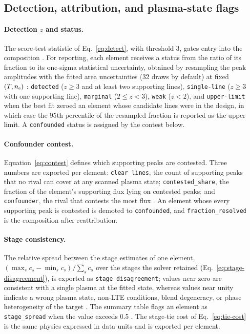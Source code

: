 \subsection{Detection, attribution, and plasma-state flags}

\paragraph{Detection $z$ and status.}
The score-test statistic of Eq.~\eqref{eq:detect}, with threshold 3, gates entry into the composition %
. For reporting, each element receives a status from the ratio of its fraction to its one-sigma statistical uncertainty, obtained by resampling the peak amplitudes with the fitted area uncertainties (32 draws by default) at fixed $(T,n_{\mathrm{e}})$ %
: \texttt{detected} ($z\ge3$ and at least two supporting lines), \texttt{single-line} ($z\ge3$ with one supporting line), \texttt{marginal} ($2\le z<3$), \texttt{weak} ($z<2$), and \texttt{upper-limit} when the best fit zeroed an element whose candidate lines were in the design, in which case the 95th percentile of the resampled fraction is reported as the upper limit. A \texttt{confounded} status is assigned by the contest below.

\paragraph{Confounder contest.}
Equation~\eqref{eq:contest} defines which supporting peaks are contested. Three numbers are exported per element: \texttt{clear\_lines}, the count of supporting peaks that no rival can cover at any scanned plasma state; \texttt{contested\_share}, the fraction of the element's supporting flux lying on contested peaks; and \texttt{confounder}, the rival that contests the most flux %
. An element whose every supporting peak is contested is demoted to \texttt{confounded}, and \texttt{fraction\_resolved} is the composition after reattribution.

\paragraph{Stage consistency.}
The relative spread between the stage estimates of one element, $(\max_s c_s-\min_s c_s)/\sum_s c_s$ over the stages the solver retained (Eq.~\eqref{eq:stage-disagreement}), is exported as \texttt{stage\_disagreement}; values near zero are consistent with a single plasma at the fitted state, whereas values near unity indicate a wrong plasma state, non-LTE conditions, blend degeneracy, or phase heterogeneity of the target %
. The summary table flags an element as \texttt{stage\_spread} when the value exceeds 0.5 %
. The stage-tie cost of Eq.~\eqref{eq:tie-cost} is the same physics expressed in data units and is exported per element.

